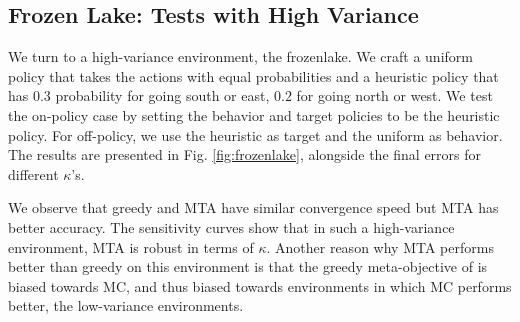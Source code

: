 \documentclass{article}
\begin{document}
\subsection{Frozen Lake: Tests with High Variance}
We turn to a high-variance environment, the frozenlake. We craft a uniform policy that takes the actions with equal probabilities and a heuristic policy that has $0.3$ probability for going south or east, $0.2$ for going north or west. We test the on-policy case by setting the behavior and target policies to be the heuristic policy. For off-policy, we use the heuristic as target and the uniform as behavior. The results are presented in Fig. \ref{fig:frozenlake}, alongside the final errors for different $\kappa$'s.
\par
We observe that greedy and MTA have similar convergence speed but MTA has better accuracy. The sensitivity curves show that in such a high-variance environment, MTA is robust in terms of $\kappa$. Another reason why MTA performs better than greedy on this environment is that the greedy meta-objective of \cite{white2016greedy} is biased towards MC, and thus biased towards environments in which MC performs better, \ie{} the low-variance environments.
\par
\end{document}
